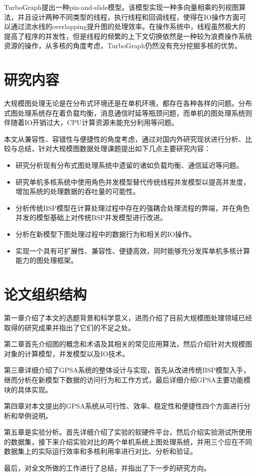 TurboGraph\cite{han2013turbograph}提出一种pin-and-slide模型。该模型实现一种多向量相乘的列视图算法，并且设计两种不同类型的线程，执行线程和回调线程，使得在IO操作方面可以通过流水线的overlapping提升图的处理效率。在操作系统中，线程虽然极大的提高了程序的并发性，但是线程的频繁的上下文切换依然是一种较为浪费操作系统资源的操作，从多核的角度考虑，TurboGraph仍然没有充分挖掘多核的优势。



\section{研究内容}



大规模图处理无论是在分布式环境还是在单机环境，都存在各种各样的问题。分布式图处理系统存在着负载均衡，消息通信时延等瓶颈问题，而单机的图处理系统则伴随着IO开销过大，CPU计算资源未能充分利用等问题。

本文从兼容性、容错性与便捷性的角度考虑，通过对国内外研究现状进行分析、比较与总结，针对大规模图数据处理课题提出如下几点主要研究内容：
\begin{itemize}
\item 研究分析现有分布式图处理系统中遗留的诸如负载均衡、通信延迟等问题。
\item 研究单机多核系统中使用角色并发模型替代传统线程并发模型以提高并发度，增加系统的处理数据的吞吐量的可能性。
\item 分析传统BSP模型在计算处理过程中存在的强耦合处理流程的弊端，并在角色并发的模型基础上对传统BSP并发模型进行改进。
\item 分析在新模型下图处理过程中的数据行为和相关的IO操作。
\item 实现一个具有可扩展性、兼容性、便捷高效，同时能够充分发挥单机多核计算能力的图处理框架。
\end{itemize}

\section{论文组织结构}

第一章介绍了本文的选题背景和科学意义，进而介绍了目前大规模图处理领域已经取得的研究成果并指出了它们的不足之处。

第二章首先介绍图的概念和术语及其相关的常见应用算法，然后介绍针对大规模图对象的计算模型，并发模型以及IO技术。

第三章详细介绍了GPSA系统的整体设计与实现，首先从改进传统BSP模型入手，继而分析在新模型下数据的访问行为和工作方式，最后详细介绍GPSA主要功能模块的具体实现。

第四章对本文提出的GPSA系统从可行性、效率、稳定性和便捷性四个方面进行分析和举例说明。

第五章是实验分析。首先详细介绍了实验的软硬件平台，然后介绍实验测试所使用的数据集，接下来介绍实验对比的两个单机系统上图处理系统，并用三个应在不同数据集上的实际运行效率和多核利用率进行对比、分析和验证。

最后，对全文所做的工作进行了总结，并指出了下一步的研究方向。